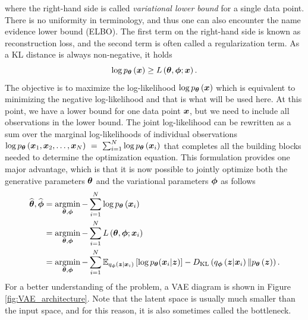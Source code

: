 where the right-hand side is called \emph{variational lower bound} for a single data point. There is no uniformity in terminology, and thus one can also encounter the name evidence lower bound (ELBO). The first term on the right-hand side is known as reconstruction loss, and the second term is often called a regularization term. As a KL distance is always non-negative, it holds
\begin{equation}
    \log p_{\boldsymbol{\theta}}\left(\boldsymbol{x}\right) \geq L\left(\boldsymbol{\theta},\boldsymbol{\phi}; \boldsymbol{x}\right).
\end{equation}
The objective is to maximize the log-likelihood $\log p_{\boldsymbol{\theta}}\left(\boldsymbol{x}\right)$ which is equivalent to minimizing the negative log-likelihood and that is what will be used here. At this point, we have a lower bound for one data point $\boldsymbol{x}$, but we need to include all observations in the lower bound. The joint log-likelihood can be rewritten as a sum over the marginal log-likelihoods of individual observations $\log p_{\boldsymbol{\theta}}\left(\boldsymbol{x}_1,\boldsymbol{x}_2,\dots,\boldsymbol{x}_N\right)~=~\sum_{i=1}^N\log p_{\boldsymbol{\theta}}\left(\boldsymbol{x}_i\right)$ that completes all the building blocks needed to determine the optimization equation. This formulation provides one major advantage, which is that it is now possible to jointly optimize both the generative parameters $\boldsymbol{\theta}$ and the variational parameters $\boldsymbol{\phi}$ as follows 
\begin{align}
   \widehat{\boldsymbol{\theta}}, \widehat{\boldsymbol{\phi}} &= \mathop{\mathrm{argmin}}_{\boldsymbol{\theta},\boldsymbol{\phi}}-\sum_{i=1}^N\log p_{\boldsymbol{\theta}}\left(\boldsymbol{x}_i\right)\\
   &=\mathop{\mathrm{argmin}}_{\boldsymbol{\theta},\boldsymbol{\phi}}-\sum_{i=1}^N L\left(\boldsymbol{\theta},\boldsymbol{\phi}; \boldsymbol{x}_i\right)\\
  &= \mathop{\mathrm{argmin}}_{\boldsymbol{\theta},\boldsymbol{\phi}}-\sum_{i=1}^N\mathbb{E}_{q_{\boldsymbol{\phi}}\left(\boldsymbol{z}\vert \boldsymbol{x}_i \right)}\left[\log p_{\boldsymbol{\theta}}(\boldsymbol{x}_i\vert \boldsymbol{z}) \right] - D_{\mathrm{KL}}\left(q_{\boldsymbol{\phi}}\left(\boldsymbol{z}\vert\boldsymbol{x}_i \right) \Vert p_{\boldsymbol{\theta}}\left(\boldsymbol{z}\right)\right).\label{eq:VAEloss}
\end{align}
For a better understanding of the problem, a VAE diagram is shown in Figure \ref{fig:VAE_architecture}. Note that the latent space is usually much smaller than the input space, and for this reason, it is also sometimes called the bottleneck. 


